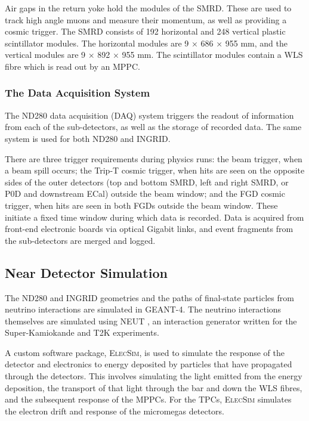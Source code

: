 Air gaps in the return yoke hold the modules of the SMRD. These are used to track high angle muons and measure their momentum, as well as providing a cosmic trigger. The SMRD consists of 192 horizontal and 248 vertical plastic scintillator modules. The horizontal modules are 9 × 686 × 955 mm, and the vertical modules are 9 × 892 × 955 mm. The scintillator modules contain a WLS fibre which is read out by an MPPC.

\subsubsection{The Data Acquisition System}\label{sec:daq}

The ND280 data acquisition (DAQ) system triggers the readout of information from each of the sub-detectors, as well as the storage of recorded data. The same system is used for both ND280 and INGRID.

There are three trigger requirements during physics runs: the beam trigger, when a beam spill occurs; the Trip-T cosmic trigger, when hits are seen on the opposite sides of the outer detectors (top and bottom SMRD, left and right SMRD, or P0D and downstream ECal) outside the beam window; and the FGD cosmic trigger, when hits are seen in both FGDs outside the beam window. These initiate a fixed time window during which data is recorded. Data is acquired from front-end electronic boards via optical Gigabit links, and event fragments from the sub-detectors are merged and logged.

\subsection{Near Detector Simulation}\label{sec:ndsim}

The ND280 and INGRID geometries and the paths of final-state particles from neutrino interactions are simulated in \textsc{GEANT-4}. The neutrino interactions themselves are simulated using \textsc{NEUT} \cite{neut}, an interaction generator written for the Super-Kamiokande and T2K experiments.

A custom software package, \textsc{ElecSim}, is used to simulate the response of the detector and electronics to energy deposited by particles that have propagated through the detectors. This involves simulating the light emitted from the energy deposition, the transport of that light through the bar and down the WLS fibres, and the subsequent response of the MPPCs. For the TPCs, \textsc{ElecSim} simulates the electron drift and response of the micromegas detectors. 

